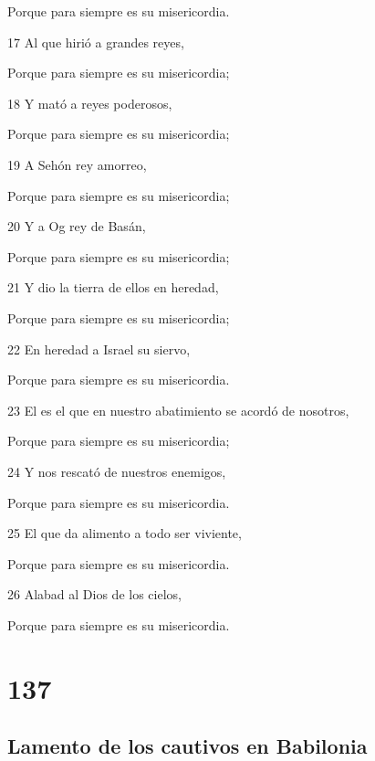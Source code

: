 \par Porque para siempre es su misericordia.
\par 17 Al que hirió a grandes reyes,
\par Porque para siempre es su misericordia;
\par 18 Y mató a reyes poderosos,
\par Porque para siempre es su misericordia;
\par 19 A Sehón rey amorreo,
\par Porque para siempre es su misericordia;
\par 20 Y a Og rey de Basán,
\par Porque para siempre es su misericordia;
\par 21 Y dio la tierra de ellos en heredad,
\par Porque para siempre es su misericordia;
\par 22 En heredad a Israel su siervo,
\par Porque para siempre es su misericordia.
\par 23 El es el que en nuestro abatimiento se acordó de nosotros,
\par Porque para siempre es su misericordia;
\par 24 Y nos rescató de nuestros enemigos,
\par Porque para siempre es su misericordia.
\par 25 El que da alimento a todo ser viviente,
\par Porque para siempre es su misericordia.
\par 26 Alabad al Dios de los cielos,
\par Porque para siempre es su misericordia.

\chapter{137}

\section*{Lamento de los cautivos en Babilonia}

